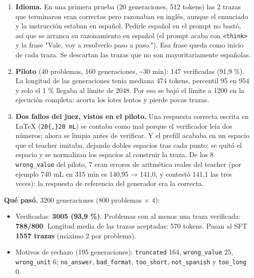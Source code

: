 \begin{enumerate}
\tightlist
\item
  \textbf{Idioma.} En una primera prueba (20 generaciones, 512 tokens) las 2 trazas que terminaron
  eran correctas pero razonaban en inglés, aunque el enunciado y la instrucción estaban en
  español. Pedirle español en el prompt no bastó, así que se arranca su razonamiento en español
  (el prompt acaba con \texttt{\textless{}think\textgreater{}} y la frase "Vale, voy a resolverlo paso a paso."). Esa frase
  queda como inicio de cada traza. Se descartan las trazas que no son mayoritariamente españolas.
\item
  \textbf{Piloto} (40 problemas, 160 generaciones, \textasciitilde30 min): 147 verificadas (91,9 \%). La longitud
  de las generaciones tenía mediana 474 tokens, percentil 95 en 954 y solo el 1 \% llegaba al
  límite de 2048. Por eso se bajó el límite a 1200 en la ejecución completa: acorta los lotes
  lentos y pierde pocas trazas.
\item
  \textbf{Dos fallos del juez, vistos en el piloto.} Una respuesta correcta escrita en LaTeX
  (\texttt{20\{,\}20 mL}) se contaba como mal porque el verificador leía dos números; ahora se limpia
  antes de verificar. Y el prefill acababa en un espacio que el teacher imitaba, dejando dobles
  espacios tras cada punto; se quitó el espacio y se normalizan los espacios al construir la traza.
  De los 8 \texttt{wrong\_\allowbreak{}value} del piloto, 7 eran errores de aritmética reales del teacher (por
  ejemplo 740 mL en 315 min es 140,95 → 141,0, y contestó 141,1 las tres veces): la respuesta de
  referencia del generador era la correcta.
\end{enumerate}

\textbf{Qué pasó.} 3200 generaciones (800 problemas × 4):

\begin{itemize}
\tightlist
\item
  Verificadas: \textbf{3005 (93,9 \%)}. Problemas con al menos una traza verificada: \textbf{788/800}.
  Longitud media de las trazas aceptadas: 570 tokens. Pasan al SFT \textbf{1557 trazas} (máximo 2 por
  problema).
\item
  Motivos de rechazo (195 generaciones): \texttt{truncated} 164, \texttt{wrong\_\allowbreak{}value} 25, \texttt{wrong\_\allowbreak{}unit} 6;
  \texttt{no\_\allowbreak{}answer}, \texttt{bad\_\allowbreak{}format}, \texttt{too\_\allowbreak{}short}, \texttt{not\_\allowbreak{}spanish} y \texttt{too\_\allowbreak{}long} 0.
\end{itemize}

